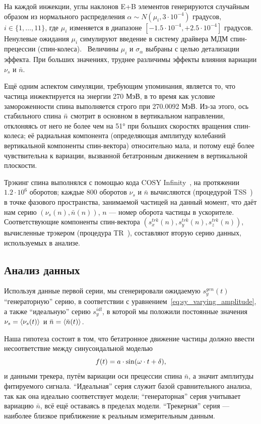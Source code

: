 На каждой инжекции, углы наклонов E+B элементов генерируются случайным образом из
нормального распределения $\alpha\sim N(\mu_i, 3\cdot 10^{-4})$ градусов, $i\in\{1,\dots,11\}$, где
$\mu_i$ изменяется в диапазоне $[-1.5\cdot10^{-4}, +2.5\cdot10^{-4}]$ градусов. Ненулевые ожидания $\mu_i$
симулируют введение в систему драйвера МДМ спин-прецессии (спин-колеса).~\cite{Koop:SpinWheel2015} 
Величины $\mu_i$ и $\sigma_{\alpha}$ выбраны с целью детализации эффекта. 
При больших значениях, труднее различимы эффекты влияния вариации
$\nu_s$ и $\bar n$.

Ещё одним аспектом симуляции, требующим упоминания, является то, что частица инжектируется на энергии 270 МэВ, в то время как условие замороженности спина выполняется строго при 270.0092 МэВ. Из-за этого, ось стабильного спина $\bar n$ смотрит в основном в вертикальном направлении, отклоняясь от него не более чем на \ang{51} при больших скоростях вращения спин-колеса; её радиальная компонента (определяющая амплитуду колебаний вертикальной компоненты спин-вектора) относительно мала, и потому ещё более чувствительна к вариации, вызванной бетатронным движением в вертикальной плоскости.

Трэкинг спина выполнялся с помощью кода COSY Infinity~\cite{COSYINF:Website}, на протяжении $1.2\cdot10^6$
оборотов; каждые 800 оборотов $\nu_s$ и $\bar n$ вычисляются (процедурой
TSS~\cite[стр.~41]{COSYINF:Manual:BeamPhys}) в точке фазового пространства, занимаемой частицей на данный момент,
что даёт нам серию $(\nu_s(n), \bar n(n))$, $n$ --- номер оборота частицы в ускорителе.
Соответствующие компоненты спин-вектора $(s_x^{trk}(n), s_y^{trk}(n), s_z^{trk}(n))$,
вычисленные трэкером (процедура TR~\cite[стр.~41]{COSYINF:Manual:BeamPhys}), составляют вторую серию данных,
используемых в анализе.

\subsection{Анализ данных}
Используя данные первой серии, мы сгенерировали ожидаемую $s_y^{gen}(t)$ ``генераторную'' серию,
в соответствии с уравнением~\eqref{eq:sy_varying_amplitude}, а также ``идеальную'' серию $s_y^{idl}$, в которой
мы положили постоянные значения $\nu_s = \avg{\nu_s(t)}$ и $\bar n =\avg{\bar n(t)}$. 

Наша гипотеза состоит в том, что бетатронное движение частицы
должно ввести несоответствие между синусоидальной моделью
\begin{equation}
  f(t) = a\cdot\sin(\omega\cdot t + \delta),\label{eq:fit_model}
\end{equation}
и данными трекера, путём вариации оси прецессии спина $\bar n$, а значит амплитуды
фитируемого сигнала. ``Идеальная'' серия служит базой сравнительного анализа,
так как она идеально соответствует модели; ``генераторная'' серия учитывает вариацию $\bar n$,
всё ещё оставаясь в пределах модели. ``Трекерная'' серия --- наиболее близкое приближение
к реальным измерительным данным.

